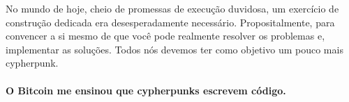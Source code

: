 No mundo de hoje, cheio de promessas de execução duvidosa, um exercício de construção dedicada 
era desesperadamente necessário. Propositalmente, para convencer a si mesmo de que você pode realmente resolver os problemas e, implementar as soluções. 
Todos nós devemos ter como objetivo um pouco mais cypherpunk. 

\paragraph{O Bitcoin me ensinou que cypherpunks escrevem código.}

%
%
%
%
